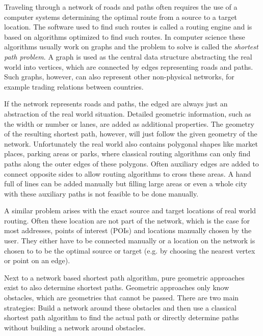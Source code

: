 Traveling through a network of roads and paths often requires the use of a computer systems determining the optimal route from a source to a target location.
The software used to find such routes is called a routing engine and is based on algorithms optimized to find such routes.
In computer science these algorithms usually work on graphs and the problem to solve is called the \textit{shortest path problem}.
A graph is used as the central data structure abstracting the real world into vertices, which are connected by edges representing roads and paths.
Such graphs, however, can also represent other non-physical networks, for example trading relations between countries\citationNeeded.

If the network represents roads and paths, the edged are always just an abstraction of the real world situation.
Detailed geometric information, such as the width or number or lanes, are added as additional properties.
The geometry of the resulting shortest path, however, will just follow the given geometry of the network.
Unfortunately the real world also contains polygonal shapes like market places, parking areas or parks, where classical routing algorithms can only find paths along the outer edges of these polygons.
Often auxiliary edges are added to connect opposite sides to allow routing algorithms to cross these areas.
A hand full of lines can be added manually but filling large areas or even a whole city with these auxiliary paths is not feasible to be done manually.

A similar problem arises with the exact source and target locations of real world routing.
Often these location are not part of the network, which is the case for most addresses, points of interest (POIs) and locations manually chosen by the user.
They either have to be connected manually or a location on the network is chosen to to be the optimal source or target (e.g. by choosing the nearest  vertex or point on an edge).

Next to a network based shortest path algorithm, pure geometric approaches exist to also determine shortest paths.
Geometric approaches only know obstacles, which are geometries that cannot be passed.
There are two main strategies\citationNeeded:
Build a network around these obstacles and then use a classical shortest path algorithm to find the actual path or directly determine paths without building a network around obstacles.

